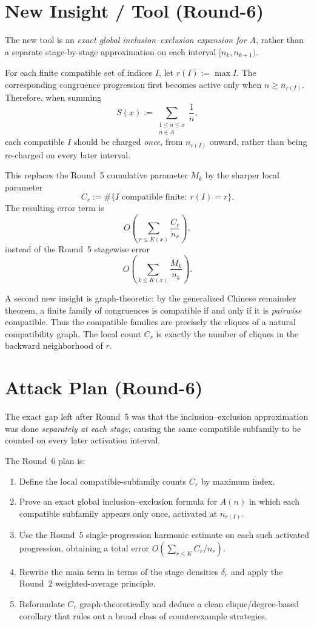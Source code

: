\section{New Insight / Tool (Round-6)}
The new tool is an \emph{exact global inclusion--exclusion expansion for $A$}, rather than a separate stage-by-stage approximation on each interval $[n_k,n_{k+1})$.

For each finite compatible set of indices $I$, let $r(I):=\max I$.  The corresponding congruence progression first becomes active only when $n\ge n_{r(I)}$.  Therefore, when summing
\[
S(x):=\sum_{\substack{1\le n\le x\\ n\in A}}\frac1n,
\]
each compatible $I$ should be charged \emph{once}, from $n_{r(I)}$ onward, rather than being re-charged on every later interval.

This replaces the Round~5 cumulative parameter $M_k$ by the sharper local parameter
\[
C_r:=\#\{I\text{ compatible finite}:\ r(I)=r\}.
\]
The resulting error term is
\[
O\!\left(\sum_{r\le K(x)}\frac{C_r}{n_r}\right),
\]
instead of the Round~5 stagewise error
\[
O\!\left(\sum_{k\le K(x)}\frac{M_k}{n_k}\right).
\]

A second new insight is graph-theoretic: by the generalized Chinese remainder theorem, a finite family of congruences is compatible if and only if it is \emph{pairwise} compatible.  Thus the compatible families are precisely the cliques of a natural compatibility graph.  The local count $C_r$ is exactly the number of cliques in the backward neighborhood of $r$.

\section{Attack Plan (Round-6)}
The exact gap left after Round~5 was that the inclusion--exclusion approximation was done \emph{separately at each stage}, causing the same compatible subfamily to be counted on every later activation interval.

The Round~6 plan is:
\begin{enumerate}
\item Define the local compatible-subfamily counts $C_r$ by maximum index.
\item Prove an exact global inclusion--exclusion formula for $A(n)$ in which each compatible subfamily appears only once, activated at $n_{r(I)}$.
\item Use the Round~5 single-progression harmonic estimate on each such activated progression, obtaining a total error $O(\sum_{r\le K} C_r/n_r)$.
\item Rewrite the main term in terms of the stage densities $\delta_r$ and apply the Round~2 weighted-average principle.
\item Reformulate $C_r$ graph-theoretically and deduce a clean clique/degree-based corollary that rules out a broad class of counterexample strategies.
\end{enumerate}

